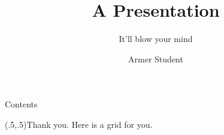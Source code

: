 \documentclass[]{MRTbeam}
\title{A Presentation}
\subtitle{It'll blow your mind}
\author[A. Student]{Armer Student}
\begin{document}
\begingroup
\OnlyOneTopRuletrue
\begin{frame}%
\maketitle
\end{frame}%
\endgroup

\begin{frame}{Contents}{}%
\tableofcontents
\end{frame}%

\StartOfProgress



\EndOfProgress

\begin{whiteframes}
  \ShowGrid
  \begin{frame}{\relax}{\relax}%
    \PlaceAt(.5,.5){\Huge Thank you. Here is a grid for you.}
  \end{frame}%
\end{whiteframes}

\end{document}
